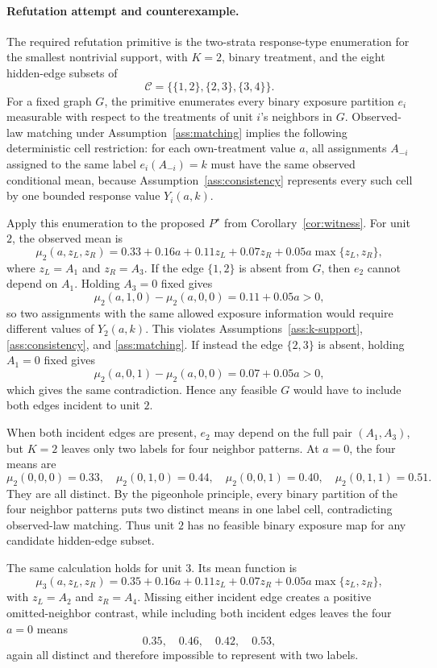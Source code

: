 \documentclass[11pt]{article}
\theoremstyle{definition}
\theoremstyle{plain}
\theoremstyle{remark}
\begin{document}
\paragraph{Refutation attempt and counterexample.}
The required refutation primitive is the two-strata response-type enumeration for the smallest nontrivial support, with \(K=2\), binary treatment, and the eight hidden-edge subsets of
\[
\mathcal C=\{\{1,2\},\{2,3\},\{3,4\}\}.
\]
For a fixed graph \(G\), the primitive enumerates every binary exposure partition \(e_i\) measurable with respect to the treatments of unit \(i\)'s neighbors in \(G\).  Observed-law matching under Assumption~\ref{ass:matching} implies the following deterministic cell restriction: for each own-treatment value \(a\), all assignments \(A_{-i}\) assigned to the same label \(e_i(A_{-i})=k\) must have the same observed conditional mean, because Assumption~\ref{ass:consistency} represents every such cell by one bounded response value \(Y_i(a,k)\).

Apply this enumeration to the proposed \(P^\star\) from Corollary~\ref{cor:witness}.  For unit \(2\), the observed mean is
\[
\mu_2(a,z_L,z_R)=0.33+0.16a+0.11z_L+0.07z_R+0.05a\max\{z_L,z_R\},
\]
where \(z_L=A_1\) and \(z_R=A_3\).  If the edge \(\{1,2\}\) is absent from \(G\), then \(e_2\) cannot depend on \(A_1\).  Holding \(A_3=0\) fixed gives
\[
\mu_2(a,1,0)-\mu_2(a,0,0)=0.11+0.05a>0,
\]
so two assignments with the same allowed exposure information would require different values of \(Y_2(a,k)\).  This violates Assumptions~\ref{ass:k-support}, \ref{ass:consistency}, and \ref{ass:matching}.  If instead the edge \(\{2,3\}\) is absent, holding \(A_1=0\) fixed gives
\[
\mu_2(a,0,1)-\mu_2(a,0,0)=0.07+0.05a>0,
\]
which gives the same contradiction.  Hence any feasible \(G\) would have to include both edges incident to unit \(2\).

When both incident edges are present, \(e_2\) may depend on the full pair \((A_1,A_3)\), but \(K=2\) leaves only two labels for four neighbor patterns.  At \(a=0\), the four means are
\[
\mu_2(0,0,0)=0.33,\quad
\mu_2(0,1,0)=0.44,\quad
\mu_2(0,0,1)=0.40,\quad
\mu_2(0,1,1)=0.51.
\]
They are all distinct.  By the pigeonhole principle, every binary partition of the four neighbor patterns puts two distinct means in one label cell, contradicting observed-law matching.  Thus unit \(2\) has no feasible binary exposure map for any candidate hidden-edge subset.

The same calculation holds for unit \(3\).  Its mean function is
\[
\mu_3(a,z_L,z_R)=0.35+0.16a+0.11z_L+0.07z_R+0.05a\max\{z_L,z_R\},
\]
with \(z_L=A_2\) and \(z_R=A_4\).  Missing either incident edge creates a positive omitted-neighbor contrast, while including both incident edges leaves the four \(a=0\) means
\[
0.35,\quad 0.46,\quad 0.42,\quad 0.53,
\]
again all distinct and therefore impossible to represent with two labels.
\end{document}
